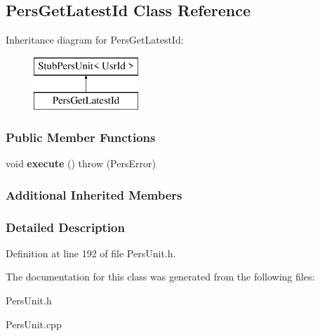 \hypertarget{classPersGetLatestId}{\subsection{Pers\-Get\-Latest\-Id Class Reference}
\label{d3/dab/classPersGetLatestId}
}
Inheritance diagram for Pers\-Get\-Latest\-Id\-:\begin{figure}[H]
\begin{center}
\leavevmode
\includegraphics[height=2.000000cm]{d3/dab/classPersGetLatestId}
\end{center}
\end{figure}
\subsubsection*{Public Member Functions}
\begin{DoxyCompactItemize}
\item 
\hypertarget{classPersGetLatestId_a11340d0091a1d8bf164011be400609f7}{void {\bfseries execute} ()  throw (\-Pers\-Error)}\label{d3/dab/classPersGetLatestId_a11340d0091a1d8bf164011be400609f7}

\end{DoxyCompactItemize}
\subsubsection*{Additional Inherited Members}


\subsubsection{Detailed Description}


Definition at line 192 of file Pers\-Unit.\-h.



The documentation for this class was generated from the following files\-:\begin{DoxyCompactItemize}
\item 
Pers\-Unit.\-h\item 
Pers\-Unit.\-cpp\end{DoxyCompactItemize}

